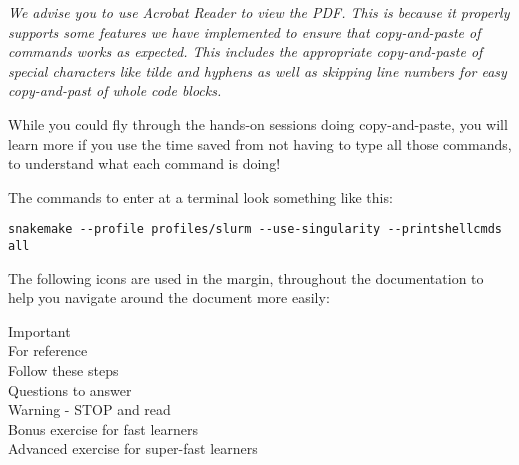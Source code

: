 \emph{We advise you to use Acrobat Reader to view the PDF. This is because it properly supports some
features we have implemented to ensure that copy-and-paste of commands works as expected. This
includes the appropriate copy-and-paste of special characters like tilde and hyphens as well as
skipping line numbers for easy copy-and-past of whole code blocks.}

\begin{warning}
While you could fly through the hands-on sessions doing copy-and-paste, you will learn more if you
use the time saved from not having to type all those commands, to understand what each command is
doing!
\end{warning}

The commands to enter at a terminal look something like this:
\begin{lstlisting}
snakemake --profile profiles/slurm --use-singularity --printshellcmds all 
\end{lstlisting}  

The following icons are used in the margin, throughout the documentation to help you navigate around
the document more easily:

\hspace*{.2cm} Important\\
\hspace*{.2cm} For reference\\
\hspace*{.2cm} Follow these steps\\
\hspace*{.2cm} Questions to answer\\
\hspace*{.2cm} Warning - STOP and read\\
\hspace*{.2cm} Bonus exercise for fast learners\\
\hspace*{.2cm} Advanced exercise for super-fast learners\\

